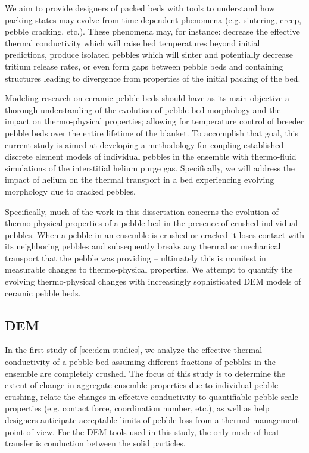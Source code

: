 We aim to provide designers of packed beds with tools to understand how packing states may evolve from time-dependent phenomena (e.g. sintering, creep, pebble cracking, etc.). These phenomena may, for instance: decrease the effective thermal conductivity which will raise bed temperatures beyond initial predictions, produce isolated pebbles which will sinter and potentially decrease tritium release rates, or even form gaps between pebble beds and containing structures leading to divergence from properties of the initial packing of the bed.

Modeling research on ceramic pebble beds should have as its main objective a thorough understanding of the evolution of pebble bed morphology and the impact on thermo-physical properties; allowing for temperature control of breeder pebble beds over the entire lifetime of the blanket. To accomplish that goal, this current study is aimed at developing a methodology for coupling established discrete element models of individual pebbles in the ensemble with thermo-fluid simulations of the interstitial helium purge gas. Specifically, we will address the impact of helium on the thermal transport in a bed experiencing evolving morphology due to cracked pebbles.

Specifically, much of the work in this dissertation concerns the evolution of thermo-physical properties of a pebble bed in the presence of crushed individual pebbles. When a pebble in an ensemble is crushed or cracked it loses contact with its neighboring pebbles and subsequently breaks any thermal or mechanical transport that the pebble was providing -- ultimately this is manifest in measurable changes to thermo-physical properties. We attempt to quantify the evolving thermo-physical changes with increasingly sophisticated DEM models of ceramic pebble beds.


\subsection*{DEM}
In the first study of \cref{sec:dem-studies}, we analyze the effective thermal conductivity of a pebble bed assuming different fractions of pebbles in the ensemble are completely crushed. The focus of this study is to determine the extent of change in aggregate ensemble properties due to individual pebble crushing, relate the changes in effective conductivity to quantifiable pebble-scale properties (e.g. contact force, coordination number, etc.), as well as help designers anticipate acceptable limits of pebble loss from a thermal management point of view. For the DEM tools used in this study, the only mode of heat transfer is conduction between the solid particles. 



